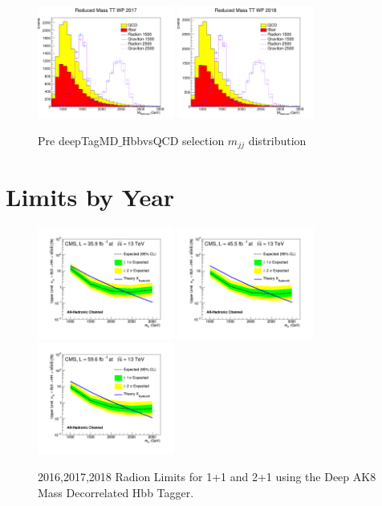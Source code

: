 \begin{figure}[!htb]
	\includegraphics[width=0.4\textwidth]{Figures/mredTT_17_deepTagMD_HbbvsQCD.png}
	\includegraphics[width=0.4\textwidth]{Figures/mredTT_18_deepTagMD_HbbvsQCD.png}
	\caption{Pre deepTagMD$\_$HbbvsQCD selection $m_{jj}$ distribution}
	\label{fig:preMredBY}
\end{figure}
\clearpage
\section{Limits by Year}
\begin{figure}[!htb]
	\centering
	\includegraphics[width=0.4\textwidth]{Figures/limits_combine_35_9fb_dak8MDHbb_signals16_RadNar.png}
	\includegraphics[width=0.4\textwidth]{Figures/limits_combine_45_5fb_dak8MDHbb_signals17_RadNar.png}
	\includegraphics[width=0.4\textwidth]{Figures/limits_combine_59_6fb_dak8MDHbb_signals18_RadNar.png}
	\caption{2016,2017,2018 Radion Limits for 1+1 and 2+1 using the Deep AK8 Mass Decorrelated Hbb Tagger.}
	\label{fig:RadionLimit161718}
\end{figure}

